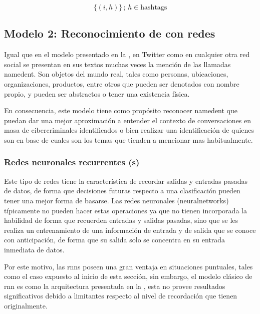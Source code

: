 \begin{equation} \label{eq:ovr-inverse-transform}
    \{(i, h)\} \,;\, h \in \text{hashtags}
\end{equation}


\subsection{Modelo 2: Reconocimiento de  con redes }
Igual que en el modelo presentado en la , en Twitter como en cualquier otra red social se presentan en sus textos muchas veces la mención de las llamadas \gls{namedent}. Son objetos del mundo real, tales como personas, ubicaciones, organizaciones, productos, entre otros que pueden ser denotados con nombre propio, y pueden ser abstractos o tener una existencia física.

En consecuencia, este modelo tiene como propósito reconocer \gls{namedent} que puedan dar una mejor aproximación a entender el contexto de conversaciones en masa de cibercriminales identificados o bien realizar una identificación de quienes son en base de cuales son los temas que tienden a mencionar mas habitualmente.

\subsubsection{Redes neuronales recurrentes (s)}
Este tipo de redes tiene la característica de recordar salidas y entradas pasadas de datos, de forma que decisiones futuras respecto a una clasificación pueden tener una mejor forma de basarse. Las redes neuronales (\glspl{neuralnetwork}) típicamente no pueden hacer estas operaciones ya que no tienen incorporada la habilidad de forma que recuerden entradas y salidas pasadas, sino que se les realiza un entrenamiento de una información de entrada y de salida que se conoce con anticipación, de forma que su salida solo se concentra en su entrada inmediata de datos.

Por este motivo, las \glspl{rnn} poseen una gran ventaja en situaciones puntuales, tales como el caso expuesto al inicio de esta sección, sin embargo, el modelo clásico de \gls{rnn} es como la arquitectura presentada en la , esta no provee resultados significativos debido a limitantes respecto al nivel de recordación que tienen originalmente.

